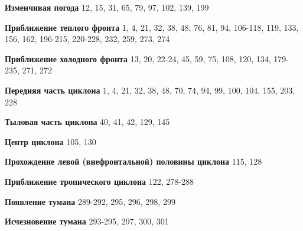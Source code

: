 \textbf{Изменчивая погода} 12, 15, 31, 65, 79, 97, 102, 139, 199

\textbf{Приближение теплого фронта} 1, 4, 21, 32, 38, 48, 76, 81, 94,
106-118, 119, 133, 156, 162, 196-215, 220-228, 232, 259, 273, 274

\textbf{Приближение холодного фронта} 13, 20, 22-24, 45, 59, 75, 108,
120, 134, 179-235, 271, 272

\textbf{Передняя часть циклона} 1, 4, 21, 32, 38, 48, 70, 74, 94, 99,
100, 104, 155, 203, 228

\textbf{Тыловая часть циклона} 40, 41, 42, 129, 145

\textbf{Центр циклона} 105, 130

\textbf{Прохождение левой (внефронтальной) половины циклона} 115, 128

\textbf{Приближение тропического циклона} 122, 278-288

\textbf{Появление тумана} 289-292, 295, 296, 298, 299

\textbf{Исчезновение тумана} 293-295, 297, 300, 301

